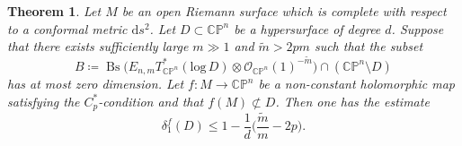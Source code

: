 \documentclass[english, 12pt]{amsart}
\DeclareMathOperator{\bs}{Bs}
\def\log{\mathrm{log}\,}
\theoremstyle{plain}
\newtheorem{thm}{Theorem}[section]
\theoremstyle{remark}
\numberwithin{equation}{section}
\theoremstyle{plain}
\theoremstyle{named}
\begin{document}
\begin{thm}\label{defect gauss map}
	Let $M$ be an open Riemann surface which is complete with respect to a conformal metric $\mathrm{d}s^2$.
	Let $D\subset \mathbb{CP}^n$ be a hypersurface of degree $d$. Suppose that there exists sufficiently large $m\gg 1$ and $\tilde{m}>2pm$ such that the subset
	\[ B\coloneq
	\bs	\big(
	E_{n,m}T_{\mathbb{C}\mathbb{P}^n}^*(\log D)
	\otimes
	\mathcal{O}_{\mathbb{C}\mathbb{P}^n}(1)^{-\widetilde{m}}
	\big)\cap \left(\mathbb{C}\mathbb{P}^n\setminus D\right)
	\]
	has at most zero dimension. Let $f\colon M\rightarrow \mathbb{CP}^n$ be a non-constant holomorphic map satisfying the $C_{p}^*$-condition and that $f(M)\not\subset D$. Then one has the estimate
	\[
	\delta_1^f(D)\leq 1-\dfrac{1}{d}\bigg(\dfrac{\widetilde{m}}{m}-2p\bigg).
	\]
\end{thm}
\end{document}

